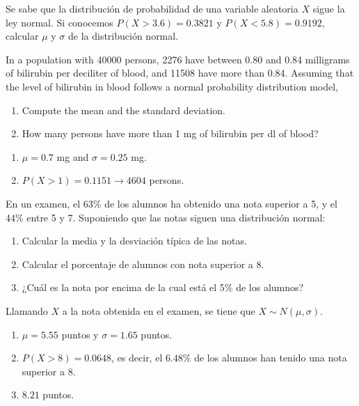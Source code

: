 {Se sabe que la distribución de probabilidad de una variable aleatoria $X$ sigue la ley normal. Si conocemos $P(X>3.6)=0.3821$ y $P(X<5.8)=0.9192$, calcular $\mu $ y $\sigma $ de la distribución normal.
}
{}
{}


{In a population with 40000 persons, 2276 have between 0.80 and 0.84 milligrams of bilirubin per deciliter of blood, and 11508 have more than 0.84.
Assuming that the level of bilirubin in blood follows a normal probability distribution model, 
\begin{enumerate}
\item Compute the mean and the standard deviation.
\item How many persons have more than 1 mg of bilirubin per dl of blood?
\end{enumerate}
}
{
\begin{enumerate}
\item $\mu=0.7$ mg and $\sigma=0.25$ mg.
\item $P(X>1)=0.1151 \rightarrow 4604$ persons.
\end{enumerate}
}
{}


{En un examen, el 63\% de los alumnos ha obtenido una nota superior a 5, y el 44\% entre 5 y 7.
Suponiendo que las notas siguen una distribución normal:

\begin{enumerate}
\item  Calcular la media y la desviación típica de las notas.
\item  Calcular el porcentaje de alumnos con nota superior a 8.
\item  ¿Cuál es la nota por encima de la cual está el 5\% de los alumnos?
\end{enumerate}
}
{Llamando $X$ a la nota obtenida en el examen, se tiene que $X\sim N(\mu,\sigma)$.
\begin{enumerate}
\item $\mu=5.55$ puntos y $\sigma=1.65$ puntos.
\item $P(X>8)=0.0648$, es decir, el $6.48\%$ de los alumnos han tenido una nota superior a 8.
\item $8.21$ puntos.
\end{enumerate}
}
{}


